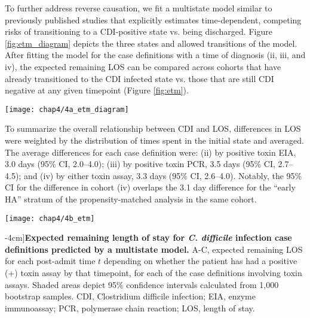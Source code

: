To further address reverse causation, we fit a multistate model similar to previously published studies\autocite{Mitchell2014,Stevens2015,VanKleef2014} that explicitly estimates time-dependent, competing risks of transitioning to a CDI-positive state vs. being discharged. Figure \ref{fig:etm_diagram} depicts the three states and allowed transitions of the model. After fitting the model for the case definitions with a time of diagnosis (ii, iii, and iv), the expected remaining LOS can be compared across cohorts that have already transitioned to the CDI infected state vs. those that are still CDI negative at any given timepoint (Figure \ref{fig:etm}).
\begin{marginfigure}
  \texttt{[image: chap4/4a\_etm\_diagram]}               
  \caption[Multistate model of \emph{C. difficile} infection]{\textbf{Multistate model of \emph{C. difficile} infection.} Three states of the multistate model and allowed transitions. Patients may only transition in the direction of the arrows.}
  \label{fig:etm_diagram}
\end{marginfigure}
To summarize the overall relationship between CDI and LOS, differences in LOS were weighted by the distribution of times spent in the initial state and averaged. The average differences for each case definition were: (ii) by positive toxin EIA, 3.0 days (95\% CI, 2.0–4.0); (iii) by positive toxin PCR, 3.5 days (95\% CI, 2.7–4.5); and (iv) by either toxin assay, 3.3 days (95\% CI, 2.6–4.0). Notably, the 95\% CI for the difference in cohort (iv) overlaps the 3.1 day difference for the “early HA” stratum of the propensity-matched analysis in the same cohort.

\begin{figure*}[htb]
  \centering
  \texttt{[image: chap4/4b\_etm]}
  \caption[Expected remaining length of stay for \emph{C. difficile} infection case definitions predicted by a multistate model][-4cm]{\textbf{Expected remaining length of stay for \emph{C. difficile} infection case definitions predicted by a multistate model.} A-C, expected remaining LOS for each post-admit time $t$ depending on whether the patient has had a positive (+) toxin assay by that timepoint, for each of the case definitions involving toxin assays. Shaded areas depict 95\% confidence intervals calculated from 1,000 bootstrap samples. CDI, Clostridium difficile infection; EIA, enzyme immunoassay; PCR, polymerase chain reaction; LOS, length of stay.
  }
  \label{fig:etm}
\end{figure*}

